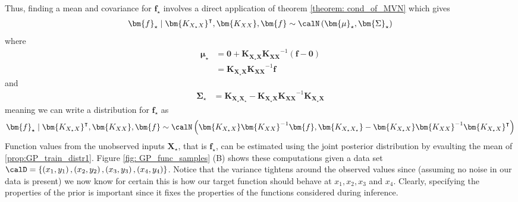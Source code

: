Thus, finding a mean and covariance for $\bm{f}_{\star}$ involves a direct application of theorem \ref{theorem: cond_of_MVN} which gives
\begin{align*}
    \bm{f}_{\star} \mid \bm{K_{X_{\star}X}}^{\intercal} , \bm{K_{XX}}, \bm{f} \sim \calN \left( \bm{\mu}_{\star}, \bm{\Sigma}_{\star} \right)
\end{align*}
where
\begin{align*}
    \bm{\mu}_{\star} & = \bm{0} + \bm{K_{X_{\star}X}} \bm{K_{XX}}^{-1} \left( \bm{f} - \bm{0} \right) \\
                     & = \bm{K_{X_{\star}X}} \bm{K_{XX}}^{-1} \bm{f}
\end{align*}
and
\begin{align*}
    \bm{\Sigma}_{\star} & = \bm{K_{X_{\star}X_{\star}}} - \bm{K_{X_{\star}X}} \bm{K_{XX}}^{-1} \bm{K_{X_{\star}X}}
\end{align*}
meaning we can write a distribution for $\bm{f}_{\star}$ as
\begin{equation}\label{prop:GP_train_distr1}
    \bm{f}_{\star} \mid \bm{K_{X_{\star}X}}^{\intercal} , \bm{K_{XX}}, \bm{f} \sim \calN \left( \bm{K_{X_{\star}X}} \bm{K_{XX}}^{-1} \bm{f},  \bm{K_{X_{\star}X_{\star}}} - \bm{K_{X_{\star}X}} \bm{K_{XX}}^{-1} \bm{K_{X_{\star}X}}^{\intercal}  \right)
\end{equation}
Function values from the unobserved inputs $\bm{X_{\star}}$, that is $\bm{f}_{\star}$, can be estimated using the joint posterior distribution by evaulting the mean of \ref{prop:GP_train_distr1}. Figure \ref{fig: GP_func_samples} (B) shows these computations given a data set $\calD = \left\{ \left( x_1 , y_1 \right) , \left( x_2 , y_2 \right) , \left( x_3 , y_3 \right) , \left( x_4 , y_4 \right) \right\}$. Notice that the variance tightens around the observed values since (assuming no noise in our data is present) we now know for certain this is how our target function should behave at $x_1,x_2,x_3$ and $x_4$. Clearly, specifying the properties of the prior is important since it fixes the properties of the functions considered during inference.

